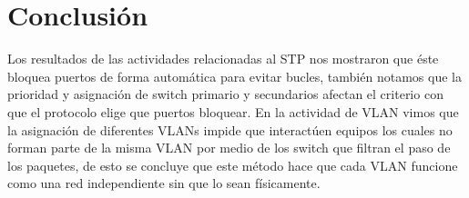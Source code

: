 \documentclass[spanish]{udpreport}
\begin{document}
\chapter{Conclusión}
Los resultados de las actividades relacionadas al STP nos mostraron que éste bloquea puertos de forma automática para evitar bucles, también notamos que la prioridad y asignación de switch primario y secundarios afectan el criterio con que el protocolo elige que puertos bloquear. En la actividad de VLAN vimos que la asignación de diferentes VLANs impide que interactúen equipos los cuales no forman parte de la misma VLAN por medio de los switch que filtran el paso de los paquetes, de esto se concluye que este método hace que cada VLAN funcione como una red independiente sin que lo sean físicamente.

\listoffigures
\end{document}
